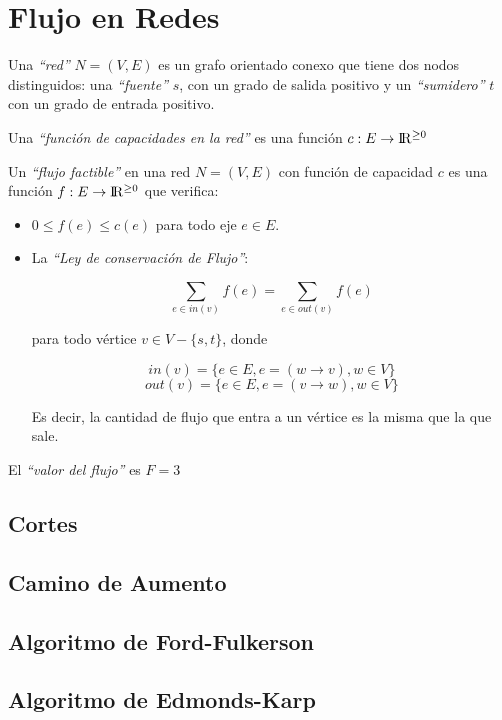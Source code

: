 \newpage
\section{Flujo en Redes}

Una \emph{``red''} $N = (V, E)$ es un grafo orientado conexo que tiene dos nodos distinguidos: una \emph{``fuente''} $s$, con un grado de salida positivo y un \emph{``sumidero''} $t$ con un grado de entrada positivo.

Una \emph{``funci\'on de capacidades en la red''} es una funci\'on $c : E \rightarrow {\rm I\!R^{\geq 0}}$

Un \emph{``flujo factible''} en una red $N = (V, E)$ con funci\'on de capacidad $c$ es una funci\'on $f : E \rightarrow {\rm I\!R^{\geq 0}}$ que verifica:

\begin{itemize}
\item $0 \leq f(e) \leq c(e)$ para todo eje $e \in E$.
\item La \emph{``Ley de conservaci\'on de Flujo''}:

\[
\sum_{e \in in(v)} f(e) = \sum_{e \in out(v)} f(e)
\]

para todo v\'ertice $v \in V - \{ s, t \}$, donde

\[
in(v) = \{ e \in E, e = (w \rightarrow v), w \in V \}
\]
\[
out(v) = \{ e \in E, e = (v \rightarrow w), w \in V \}
\]

Es decir, la cantidad de flujo que entra a un v\'ertice es la misma que la que sale.

\end{itemize}

El \emph{``valor del flujo''} es $F = 3$

\subsection{Cortes}
\subsection{Camino de Aumento}
\subsection{Algoritmo de Ford-Fulkerson}
\subsection{Algoritmo de Edmonds-Karp}
